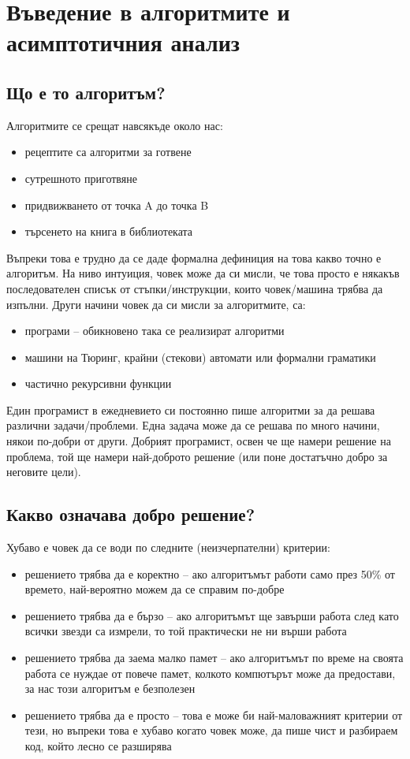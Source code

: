 \chapter{Въведение в алгоритмите и асимптотичния анализ}

\section{Що е то алгоритъм?}

Алгоритмите се срещат навсякъде около нас:
\begin{itemize}
  \item рецептите са алгоритми за готвене
  \item сутрешното приготвяне
  \item придвижването от точка A до точка B
  \item търсенето на книга в библиотеката
\end{itemize}

Въпреки това е трудно да се даде формална дефиниция на това какво точно е алгоритъм.
На ниво интуиция, човек може да си мисли, че това просто е някакъв последователен списък от стъпки/инструкции, които човек/машина трябва да изпълни.
Други начини човек да си мисли за алгоритмите, са:
\begin{itemize}
  \item програми -- обикновено така се реализират алгоритми
  \item машини на Тюринг, крайни (стекови) автомати или формални граматики
  \item частично рекурсивни функции
\end{itemize}

Един програмист в ежедневието си постоянно пише алгоритми за да решава различни задачи/проблеми.
Една задача може да се решава по много начини, някои по-добри от други.
Добрият програмист, освен че ще намери решение на проблема, той ще намери най-доброто решение (или поне достатъчно добро за неговите цели).

\section{Какво означава добро решение?}

Хубаво е човек да се води по следните (неизчерпателни) критерии:
\begin{itemize}
  \item решението трябва да е коректно -- ако алгоритъмът работи само през 50\% от времето, най-вероятно можем да се справим по-добре
  \item решението трябва да е бързо -- ако алгоритъмът ще завърши работа след като всички звезди са измрели, то той практически не ни върши работа
  \item решението трябва да заема малко памет -- ако алгоритъмът по време на своята работа се нуждае от повече памет, колкото компютърът може да предостави, за нас този алгоритъм е безполезен
  \item решението трябва да е просто -- това е може би най-маловажният критерии от тези, но въпреки това е хубаво когато човек може, да пише чист и разбираем код, който лесно се разширява
\end{itemize}

